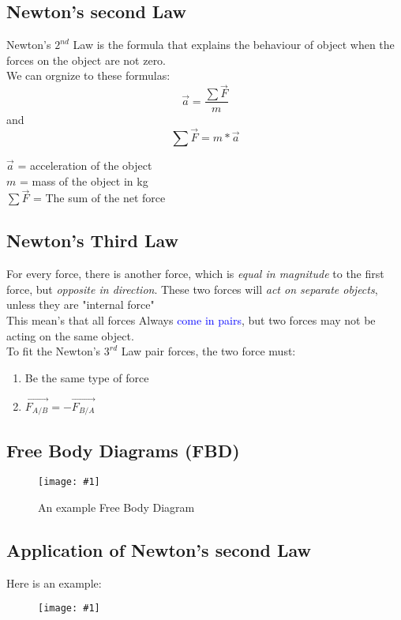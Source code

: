 \documentclass[10pt]{report}
\theoremstyle{remark}
\newcommand{\mypic}[3]{
    \begin{figure}[h!]
        \centering
        \texttt{[image: \#1]}
        \caption{#2}
    \end{figure}
}
\begin{document}
\subsection{Newton's second Law}
Newton's $2^{nd}$ Law is the formula that explains the behaviour of object when the forces on the object 
are not zero. \\
We can orgnize to these formulas:
\begin{equation}
    \vec{a} = \frac{\sum \vec{F}}{m}
\end{equation}
and\\
\begin{equation}
    \sum \vec{F} = m * \vec{a}
\end{equation}
\begin{center}
    $\vec{a}$ = acceleration of the object \\ 
    $m$ = mass of the object in kg \\ 
    $\sum \vec{F}$ = The sum of the net force
\end{center}

\subsection{Newton's Third Law}
For every force, there is another force, which is \textit{equal in magnitude} to the first force, 
but \textit{opposite in direction}. These two forces will \textit{act on separate objects},
unless they are "internal force"\\ 
This mean's that all forces Always \textcolor{blue}{come in pairs}, but two forces may not be 
acting on the same object. \\

To fit the Newton's $3^{rd}$ Law pair forces, the two force must:
\begin{enumerate}
    \item Be the same type of force
    \item $\vec{F_{A/B}} = -\vec{F_{B/A}}$
\end{enumerate}
\newpage
\subsection{Free Body Diagrams (FBD)}
\mypic{graph/graph6.png}{An example Free Body Diagram}{0.7}

\subsection{Application of Newton's second Law}
Here is an example:
\mypic{graph/graph7.png}{}{0.8}
\end{document}
